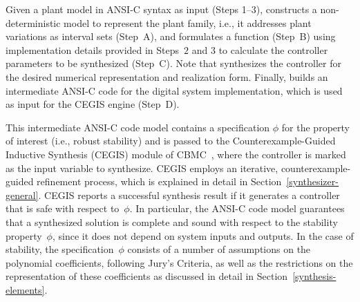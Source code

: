 \documentclass[final]{sig-alternate-05-2015}
\begin{document}
Given a plant model in ANSI-C syntax as input (Steps 1--3), \tool constructs
a non-deterministic model to represent the plant family, i.e., it addresses
plant variations as interval sets (Step~A), and formulates a function
(Step~B) using implementation details provided in Steps~$2$ and $3$ to
calculate the controller parameters to be synthesized (Step~C).  Note that
\tool synthesizes the controller for the desired numerical representation
and realization form.  Finally, \tool builds an intermediate ANSI-C code for
the digital system implementation, which is used as input for the CEGIS
engine (Step~D).

This intermediate ANSI-C code model contains a specification $\phi$ for the
property of interest (i.e., robust stability) and is passed to the
Counterexample-Guided Inductive Synthesis (CEGIS) module of
CBMC~\cite{ClarkeKL04}, where the controller is marked as the input variable
to synthesize.  CEGIS employs an iterative, counterexample-guided refinement
process, which is explained in detail in Section~\ref{synthesizer-general}. 
CEGIS reports a successful synthesis result if it generates a controller
that is safe with respect to~$\phi$.  In particular, the ANSI-C code model
guarantees that a synthesized solution is complete and sound with respect to
the stability property~$\phi$, since it does not depend on system inputs and
outputs.  In the case of stability, the specification~$\phi$ consists of a
number of assumptions on the polynomial coefficients, following Jury's
Criteria, as well as the restrictions on the representation of these
coefficients as discussed in detail in Section~\ref{synthesis-elements}.

\end{document}
